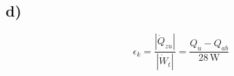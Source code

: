 

\subsection*{d)}

\begin{equation*}
\epsilon_k = \frac{|\dot{Q}_{zu}|}{|\dot{W}_t|} = \frac{Q_u - Q_{ab}}{28 \, \text{W}}
\end{equation*}